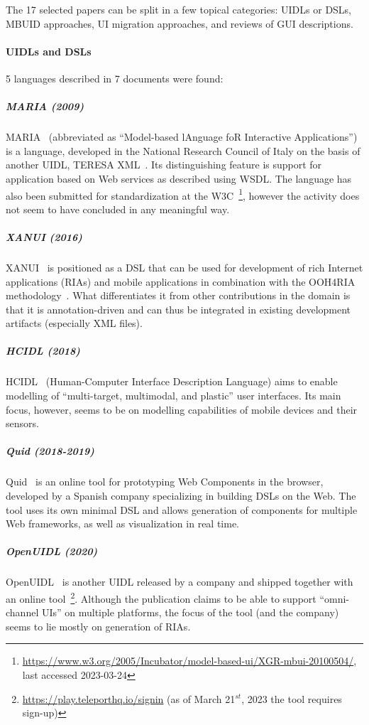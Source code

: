The 17 selected papers can be split in a few topical categories: UIDLs or DSLs, MBUID approaches, UI migration approaches, and reviews of GUI descriptions.

\paragraph{UIDLs and DSLs}
5 languages described in 7 documents were found:

\subparagraph{MARIA (2009)}
MARIA~\cite{Paterno2009, MariaPDF} (abbreviated as \enquote{Model-based lAnguage foR Interactive Applications}) is a language, developed in the National Research Council of Italy on the basis of another UIDL, TERESA XML~\cite{mori2004}.
Its distinguishing feature is support for application based on Web services as described using WSDL\@.
The language has also been submitted for standardization at the W3C~\footnote{\url{https://www.w3.org/2005/Incubator/model-based-ui/XGR-mbui-20100504/}, last accessed 2023-03-24}, however the activity does not seem to have concluded in any meaningful way.

\subparagraph{XANUI  (2016)}
XANUI~\cite{hermida2016xanui} is positioned as a DSL that can be used for development of rich Internet applications (RIAs) and mobile applications in combination with the OOH4RIA methodology~\cite{Meli2008}.
What differentiates it from other contributions in the domain is that it is annotation-driven and can thus be integrated in existing development artifacts (especially XML files).

\subparagraph{HCIDL (2018)}
HCIDL~\cite{Gaouar2018} (Human-Computer Interface Description Language) aims to enable modelling of \enquote{multi-target, multimodal, and plastic} user interfaces.
Its main focus, however, seems to be on modelling capabilities of mobile devices and their sensors.

\subparagraph{Quid (2018-2019)}
Quid~\cite{molina2018quid, Molina2019} is an online tool for prototyping Web Components in the browser, developed by a Spanish company specializing in building DSLs on the Web.
The tool uses its own minimal DSL and allows generation of components for multiple Web frameworks, as well as visualization in real time.

\subparagraph{OpenUIDL (2020)}
OpenUIDL~\cite{Moldovan2020} is another UIDL released by a company and shipped together with an online tool~\footnote{\url{https://play.teleporthq.io/signin} (as of March 21$^{st}$, 2023 the tool requires sign-up)}.
Although the publication claims to be able to support \enquote{omni-channel UIs} on multiple platforms, the focus of the tool (and the company) seems to lie mostly on generation of RIAs.

